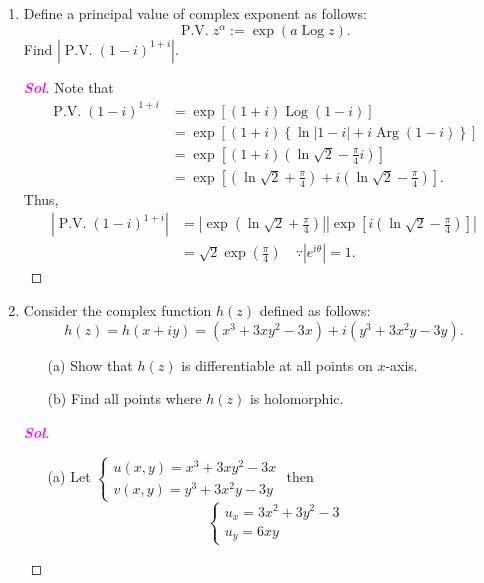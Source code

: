 \documentclass{article}
\theoremstyle{definition}
\newcommand{\set}[1]{\left\{#1\right\}}
\newcommand{\Log}{\operatorname{Log}}
\newcommand{\Arg}{\operatorname{Arg}}
\newcommand{\pv}{\operatorname{P.V.}}
\newcommand{\of}[1]{\left( #1 \right)}
\newcommand{\abs}[1]{\left\lvert #1 \right\rvert}
\newcommand{\sol}{\textcolor{magenta}{\bf Sol}}
\begin{document}
\begin{enumerate}
\begin{proof}[\sol]
\begin{align*}
		\int_Cf\of{z}dz=\int_0^{1+i}f\of{z}dz=F\of{1+i}-F\of{0}&=\of{1+i}^3-2i(1+i)^2-0\\
		&=1+3i+3i^2+i^3-2i(1+2i+i^2)\\
		&=-2+2i+(-2i+4+2i)\\
		&=2+2i.
		\end{align*}
	\end{proof}
	\newpage
	\item Define a principal value of complex exponent as follows: \[
	\pv z^\alpha:=\exp\of{a\Log z}.
	\] Find $\abs{\pv\of{1-i}^{1+i}}$.
	\begin{proof}[\sol]
		Note that \begin{align*}
			\pv (1-i)^{1+i}&=\exp\left[(1+i)\Log(1-i)\right]\\
			&=\exp\left[(1+i)\set{\ln\abs{1-i}+i\Arg\of{1-i}}\right]\\
			&=\exp\left[(1+i)\of{\ln\sqrt{2}-\frac{\pi}{4}i}\right]\\
			&=\exp\left[\of{\ln\sqrt{2}+\frac{\pi}{4}}+i\of{\ln\sqrt{2}-\frac{\pi}{4}}\right].
		\end{align*} Thus, \begin{align*}
		\abs{\pv(1-i)^{1+i}}&=\abs{\exp\of{\ln\sqrt{2}+\frac{\pi}{4}}}\abs{\exp\left[i\of{\ln\sqrt{2}-\frac{\pi}{4}}\right]}\\
		&=\sqrt{2}\exp\of{\frac{\pi}{4}}\quad\because \abs{e^{i\theta}}=1.
	\end{align*}
	\end{proof}
	\vspace{8pt}
	\item Consider the complex function $h\of{z}$ defined as follows: \[
	h\of{z}=h\of{x+iy}=\of{x^3+3xy^2-3x}+i\of{y^3+3x^2y-3y}.
	\]\begin{itemize}
		\item[(a)] Show that $h\of{z}$ is differentiable at all points on $x$-axis.
		\item[(b)] Find all points where $h\of{z}$ is holomorphic.
	\end{itemize}
	\begin{proof}[\sol]
		\begin{itemize}
			\item[(a)]
			Let $\begin{cases}
				u(x,y)=x^3+3xy^2-3x\\
				v(x,y)=y^3+3x^2y-3y
			\end{cases}$ then \[
			\begin{cases}
				u_x=3x^2+3y^2-3\\
				u_y=6xy

\end{cases}\]
\end{itemize}
\end{proof}
\end{enumerate}
\end{document}

